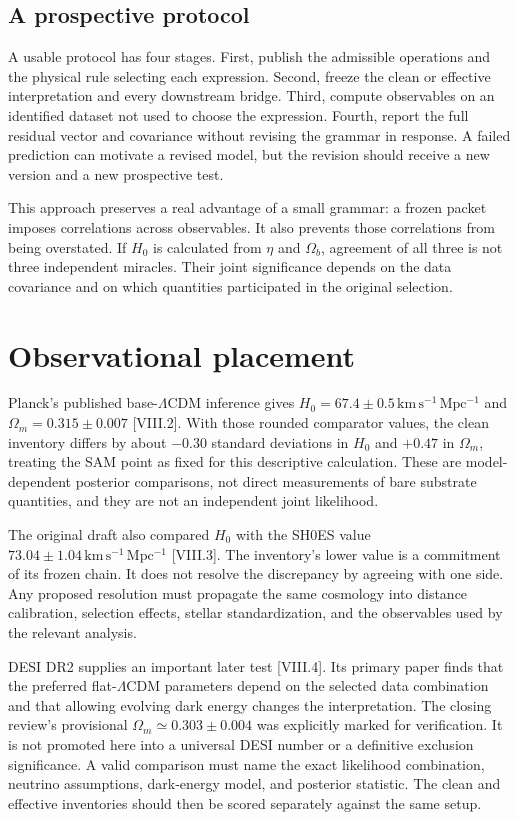 \subsection{A prospective protocol}
A usable protocol has four stages. First, publish the admissible operations and the physical rule selecting each expression. Second, freeze the clean or effective interpretation and every downstream bridge. Third, compute observables on an identified dataset not used to choose the expression. Fourth, report the full residual vector and covariance without revising the grammar in response. A failed prediction can motivate a revised model, but the revision should receive a new version and a new prospective test.

This approach preserves a real advantage of a small grammar: a frozen packet imposes correlations across observables. It also prevents those correlations from being overstated. If $H_0$ is calculated from $\eta$ and $\Omega_b$, agreement of all three is not three independent miracles. Their joint significance depends on the data covariance and on which quantities participated in the original selection.

\section{Observational placement}
Planck's published base-$\Lambda$CDM inference gives $H_0=67.4\pm0.5\,\mathrm{km\,s^{-1}\,Mpc^{-1}}$ and $\Omega_m=0.315\pm0.007$ [VIII.2]. With those rounded comparator values, the clean inventory differs by about $-0.30$ standard deviations in $H_0$ and $+0.47$ in $\Omega_m$, treating the SAM point as fixed for this descriptive calculation. These are model-dependent posterior comparisons, not direct measurements of bare substrate quantities, and they are not an independent joint likelihood.

The original draft also compared $H_0$ with the SH0ES value $73.04\pm1.04\,\mathrm{km\,s^{-1}\,Mpc^{-1}}$ [VIII.3]. The inventory's lower value is a commitment of its frozen chain. It does not resolve the discrepancy by agreeing with one side. Any proposed resolution must propagate the same cosmology into distance calibration, selection effects, stellar standardization, and the observables used by the relevant analysis.

DESI DR2 supplies an important later test [VIII.4]. Its primary paper finds that the preferred flat-$\Lambda$CDM parameters depend on the selected data combination and that allowing evolving dark energy changes the interpretation. The closing review's provisional $\Omega_m\simeq0.303\pm0.004$ was explicitly marked for verification. It is not promoted here into a universal DESI number or a definitive exclusion significance. A valid comparison must name the exact likelihood combination, neutrino assumptions, dark-energy model, and posterior statistic. The clean and effective inventories should then be scored separately against the same setup.

